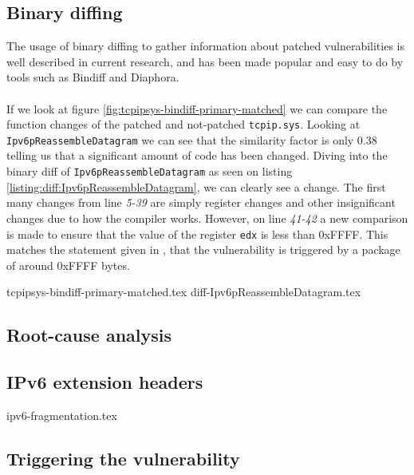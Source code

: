 \documentclass{report}
\begin{document}
\subsection{Binary diffing}
The usage of binary diffing to gather information about patched vulnerabilities is well described in current research\cite{url:binary-diffing:1}\cite{url:binary-diffing:2}, and has been made popular and easy to do by tools such as Bindiff\cite{url:bindiff:homepage} and Diaphora\cite{url:diaphora:homepage}. 
\\
\\
If we look at figure \ref{fig:tcpipsys-bindiff-primary-matched} we can compare the function changes of the patched and not-patched \texttt{tcpip.sys}. Looking at \texttt{Ipv6pReassembleDatagram} we can see that the similarity factor is only 0.38 telling us that a significant amount of code has been changed. Diving into the binary diff of \texttt{Ipv6pReassembleDatagram} as seen on listing \ref{listing:diff:Ipv6pReassembleDatagram}, we can clearly see a change. The first many changes from line \emph{5-39} are simply register changes and other insignificant changes due to how the compiler works. However, on line \emph{41-42} a new comparison is made to ensure that the value of the register \texttt{edx} is less than 0xFFFF. This matches the statement given in , that the vulnerability is triggered by a package of around 0xFFFF bytes.

{tcpipsys-bindiff-primary-matched.tex}
{diff-Ipv6pReassembleDatagram.tex}

\subsection{Root-cause analysis}

\subsection{IPv6 extension headers}
{ipv6-fragmentation.tex}
\subsection{Triggering the vulnerability}

\end{document}
